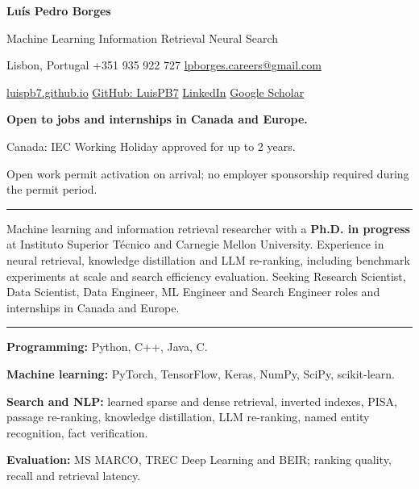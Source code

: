 \documentclass[11pt,letterpaper]{article}
\newcommand{\cvsection}[1]{\vspace{9pt}{\large\bfseries #1}\par\vspace{2pt}\hrule\vspace{5pt}}
\begin{document}
{\fontsize{25}{28}\selectfont\bfseries Luís Pedro Borges}\par
\vspace{3pt}
{\large Machine Learning \textbar{} Information Retrieval \textbar{} Neural Search}\par
\vspace{3pt}
Lisbon, Portugal \textbar{} +351 935 922 727 \textbar{} \href{mailto:lpborges.careers@gmail.com}{lpborges.careers@gmail.com}\par
\href{https://luispb7.github.io/}{luispb7.github.io}
\textbar{} \href{https://github.com/LuisPB7}{GitHub: LuisPB7}
\textbar{} \href{https://www.linkedin.com/in/lu\%C3\%ADs-borges-2a3462116/}{LinkedIn}
\textbar{} \href{https://scholar.google.com/citations?user=\_BkmlLUAAAAJ}{Google Scholar}\par
\vspace{5pt}
\textbf{Open to jobs and internships in Canada and Europe.}\par
Canada: IEC Working Holiday approved for up to 2 years.\par
Open work permit activation on arrival; no employer sponsorship required during the permit period.

\cvsection{Profile}
Machine learning and information retrieval researcher with a \textbf{Ph.D. in progress} at Instituto Superior Técnico and Carnegie Mellon University. Experience in neural retrieval, knowledge distillation and LLM re-ranking, including benchmark experiments at scale and search efficiency evaluation. Seeking Research Scientist, Data Scientist, Data Engineer, ML Engineer and Search Engineer roles and internships in Canada and Europe.

\cvsection{Technical Skills}
\textbf{Programming:} Python, C++, Java, C.\par
\textbf{Machine learning:} PyTorch, TensorFlow, Keras, NumPy, SciPy, scikit-learn.\par
\textbf{Search and NLP:} learned sparse and dense retrieval, inverted indexes, PISA, passage re-ranking, knowledge distillation, LLM re-ranking, named entity recognition, fact verification.\par
\textbf{Evaluation:} MS MARCO, TREC Deep Learning and BEIR; ranking quality, recall and retrieval latency.
\end{document}
